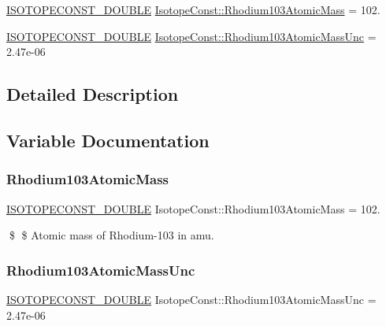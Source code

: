 \begin{DoxyCompactItemize}
\item 
\mbox{\hyperlink{group___isotope_const-_macros_ga8f45a7272ce02c0b4c65c44636ed719a}{I\+S\+O\+T\+O\+P\+E\+C\+O\+N\+S\+T\+\_\+\+D\+O\+U\+B\+LE}} \mbox{\hyperlink{group___isotope_const-_rhodium-_rh103_ga83c9af13e66a4a4c1452563a1cf027e6}{Isotope\+Const\+::\+Rhodium103\+Atomic\+Mass}} = 102.
\item 
\mbox{\hyperlink{group___isotope_const-_macros_ga8f45a7272ce02c0b4c65c44636ed719a}{I\+S\+O\+T\+O\+P\+E\+C\+O\+N\+S\+T\+\_\+\+D\+O\+U\+B\+LE}} \mbox{\hyperlink{group___isotope_const-_rhodium-_rh103_gac7f0e7c962146327f620b65ff054a7c0}{Isotope\+Const\+::\+Rhodium103\+Atomic\+Mass\+Unc}} = 2.\+47e-\/06
\end{DoxyCompactItemize}


\subsection{Detailed Description}


\subsection{Variable Documentation}
\mbox{\label{group___isotope_const-_rhodium-_rh103_ga83c9af13e66a4a4c1452563a1cf027e6}} 
\subsubsection{\texorpdfstring{Rhodium103\+Atomic\+Mass}{Rhodium103AtomicMass}}
{\footnotesize\ttfamily \mbox{\hyperlink{group___isotope_const-_macros_ga8f45a7272ce02c0b4c65c44636ed719a}{I\+S\+O\+T\+O\+P\+E\+C\+O\+N\+S\+T\+\_\+\+D\+O\+U\+B\+LE}} Isotope\+Const\+::\+Rhodium103\+Atomic\+Mass = 102.}

\$ \$ Atomic mass of Rhodium-\/103 in amu. \mbox{\label{group___isotope_const-_rhodium-_rh103_gac7f0e7c962146327f620b65ff054a7c0}} 
\subsubsection{\texorpdfstring{Rhodium103\+Atomic\+Mass\+Unc}{Rhodium103AtomicMassUnc}}
{\footnotesize\ttfamily \mbox{\hyperlink{group___isotope_const-_macros_ga8f45a7272ce02c0b4c65c44636ed719a}{I\+S\+O\+T\+O\+P\+E\+C\+O\+N\+S\+T\+\_\+\+D\+O\+U\+B\+LE}} Isotope\+Const\+::\+Rhodium103\+Atomic\+Mass\+Unc = 2.\+47e-\/06}

